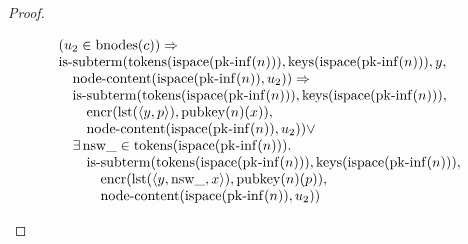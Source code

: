 \documentclass[11pt]{article}
\theoremstyle{plain}
\begin{document}
\begin{proof}
\begin{itemize}[leftmargin=2.8em, itemsep=4pt, parsep=1pt]
\begin{itemize}[leftmargin=2.8em, itemsep=4pt, parsep=1pt]
\begin{equation*}
\begin{array}{@{}l@{}}
\begin{array}{@{}l@{}} (u_{2} \in \operatorname{bnodes}(c)) \Rightarrow  \\ \operatorname{is\text{-}subterm}(\operatorname{tokens}(\operatorname{ispace}(\operatorname{pk\text{-}inf}(n))), \operatorname{keys}(\operatorname{ispace}(\operatorname{pk\text{-}inf}(n))), y, \\ \quad \operatorname{node\text{-}content}(\operatorname{ispace}(\operatorname{pk\text{-}inf}(n)), u_{2})) \Rightarrow \\ \quad \operatorname{is\text{-}subterm}(\operatorname{tokens}(\operatorname{ispace}(\operatorname{pk\text{-}inf}(n))), \operatorname{keys}(\operatorname{ispace}(\operatorname{pk\text{-}inf}(n))), \\ \quad \quad \operatorname{encr}(\operatorname{lst}(\langle y, p \rangle), \operatorname{pubkey}(n)(x)), \\ \quad \quad \operatorname{node\text{-}content}(\operatorname{ispace}(\operatorname{pk\text{-}inf}(n)), u_{2})) \vee \\ \quad \exists \operatorname{nsw\_} \in \operatorname{tokens}(\operatorname{ispace}(\operatorname{pk\text{-}inf}(n))). \\ \quad \quad \operatorname{is\text{-}subterm}(\operatorname{tokens}(\operatorname{ispace}(\operatorname{pk\text{-}inf}(n))), \operatorname{keys}(\operatorname{ispace}(\operatorname{pk\text{-}inf}(n))), \\ \quad \quad \quad \operatorname{encr}(\operatorname{lst}(\langle y, \operatorname{nsw\_}, x \rangle), \operatorname{pubkey}(n)(p)), \\ \quad \quad \quad \operatorname{node\text{-}content}(\operatorname{ispace}(\operatorname{pk\text{-}inf}(n)), u_{2})) \end{array} \\

\end{array}
\end{equation*}
\end{itemize}
\end{itemize}
\end{proof}
\end{document}
